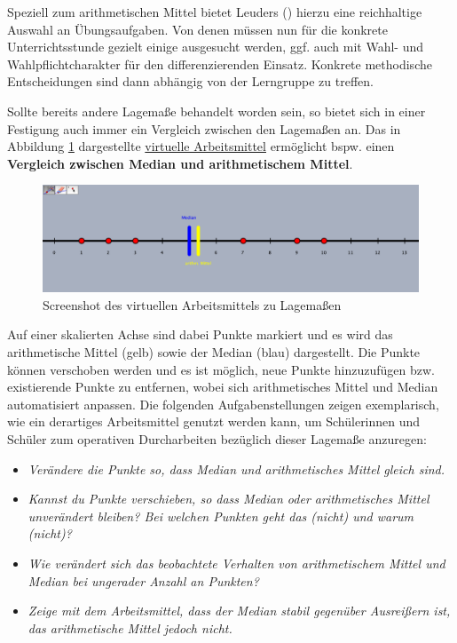 \documentclass[
]{scrbook}
\providecommand{\tightlist}{%
  \setlength{\itemsep}{0pt}\setlength{\parskip}{0pt}}
\theoremstyle{definition}
\theoremstyle{definition}
\theoremstyle{definition}
\theoremstyle{definition}
\theoremstyle{remark}
\begin{document}
Speziell zum arithmetischen Mittel bietet Leuders () hierzu eine reichhaltige Auswahl an Übungsaufgaben. Von denen müssen nun für die konkrete Unterrichtsstunde gezielt einige ausgesucht werden, ggf. auch mit Wahl- und Wahlpflichtcharakter für den differenzierenden Einsatz. Konkrete methodische Entscheidungen sind dann abhängig von der Lerngruppe zu treffen.

Sollte bereits andere Lagemaße behandelt worden sein, so bietet sich in einer Festigung auch immer ein Vergleich zwischen den Lagemaßen an. Das in Abbildung \ref{fig:ScreenshotLagemass} dargestellte \href{files/Stoffdidaktik-WiSe2223-Kap11-Lagemasse.html}{virtuelle Arbeitsmittel} ermöglicht bspw. einen \textbf{Vergleich zwischen Median und arithmetischem Mittel}.

\begin{figure}

{\centering \includegraphics[width=0.75\linewidth]{pictures/B-ScreenshotLagemass} 

}

\caption{Screenshot des virtuellen Arbeitsmittels zu Lagemaßen}\label{fig:ScreenshotLagemass}
\end{figure}

Auf einer skalierten Achse sind dabei Punkte markiert und es wird das arithmetische Mittel (gelb) sowie der Median (blau) dargestellt. Die Punkte können verschoben werden und es ist möglich, neue Punkte hinzuzufügen bzw. existierende Punkte zu entfernen, wobei sich arithmetisches Mittel und Median automatisiert anpassen. Die folgenden Aufgabenstellungen zeigen exemplarisch, wie ein derartiges Arbeitsmittel genutzt werden kann, um Schülerinnen und Schüler zum operativen Durcharbeiten bezüglich dieser Lagemaße anzuregen:

\begin{itemize}
\tightlist
\item
  \emph{Verändere die Punkte so, dass Median und arithmetisches Mittel gleich sind.}
\item
  \emph{Kannst du Punkte verschieben, so dass Median oder arithmetisches Mittel unverändert bleiben? Bei welchen Punkten geht das (nicht) und warum (nicht)?}
\item
  \emph{Wie verändert sich das beobachtete Verhalten von arithmetischem Mittel und Median bei ungerader Anzahl an Punkten?}
\item
  \emph{Zeige mit dem Arbeitsmittel, dass der Median stabil gegenüber Ausreißern ist, das arithmetische Mittel jedoch nicht.}
\end{itemize}
\end{document}
